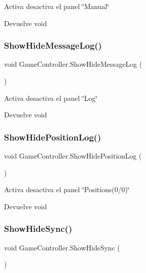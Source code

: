 Activa desactiva el panel \char`\"{}\+Manual\char`\"{} \begin{DoxyReturn}{Devuelve}
void 
\end{DoxyReturn}
\mbox{\label{class_game_controller_a3424f128577eb9fca02bc4eeb5c00f52}} 
\subsubsection{\texorpdfstring{ShowHideMessageLog()}{ShowHideMessageLog()}}
{\footnotesize\ttfamily void Game\+Controller.\+Show\+Hide\+Message\+Log (\begin{DoxyParamCaption}{ }\end{DoxyParamCaption})\hspace{0.3cm}{\ttfamily [inline]}}

Activa desactiva el panel \char`\"{}\+Log\char`\"{} \begin{DoxyReturn}{Devuelve}
void 
\end{DoxyReturn}
\mbox{\label{class_game_controller_a4115faf1339706f462166c1f82d9ec8c}} 
\subsubsection{\texorpdfstring{ShowHidePositionLog()}{ShowHidePositionLog()}}
{\footnotesize\ttfamily void Game\+Controller.\+Show\+Hide\+Position\+Log (\begin{DoxyParamCaption}{ }\end{DoxyParamCaption})\hspace{0.3cm}{\ttfamily [inline]}}

Activa desactiva el panel \char`\"{}\+Positions(0/0)\char`\"{} \begin{DoxyReturn}{Devuelve}
void 
\end{DoxyReturn}
\mbox{\label{class_game_controller_a0c878163f61d0c5f249f06076eb4414b}} 
\subsubsection{\texorpdfstring{ShowHideSync()}{ShowHideSync()}}
{\footnotesize\ttfamily void Game\+Controller.\+Show\+Hide\+Sync (\begin{DoxyParamCaption}{ }\end{DoxyParamCaption})\hspace{0.3cm}{\ttfamily [inline]}}

